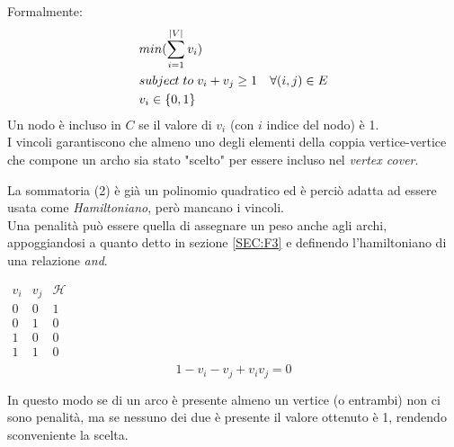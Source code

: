 \documentclass[a4paper]{article}
\begin{document}
Formalmente:
\begin{align}
	&min(\sum_{i=1}^{\lvert V \rvert}v_i)\\
	&subject \; to \; v_i + v_j \geq 1 \quad \forall (i,j) \in E \\
	& v_i \in \{0,1\} \notag
\end{align}
Un nodo è incluso in $C$ se il valore di $v_i$ (con $i$ indice del nodo) è 1.\\
I vincoli garantiscono che almeno uno degli elementi della coppia vertice-vertice che compone un archo sia stato "scelto" per essere incluso nel \textit{vertex cover}.

La sommatoria (2) è già un polinomio quadratico ed è perciò adatta ad essere usata come \textit{Hamiltoniano}, però mancano i vincoli.\\
Una penalità può essere quella di assegnare un peso anche agli archi, appoggiandosi a quanto detto in sezione \ref{SEC:F3} e definendo l'hamiltoniano di una relazione \textit{and}.
\begin{center}$\begin{array}{c|c|c}
 v_i & v_j & \mathcal{H}\\
\hline
 0 & 0 & 1  \\
 0 & 1 & 0  \\
 1 & 0 & 0  \\
 1 & 1 & 0  \\ %
\end{array}$
$$ 1- v_i - v_j +v_iv_j = 0$$
\end{center}
In questo modo se di un arco è presente almeno un vertice (o entrambi) non ci sono penalità, ma se nessuno dei due è presente il valore ottenuto è 1, rendendo sconveniente la scelta.
\end{document}
